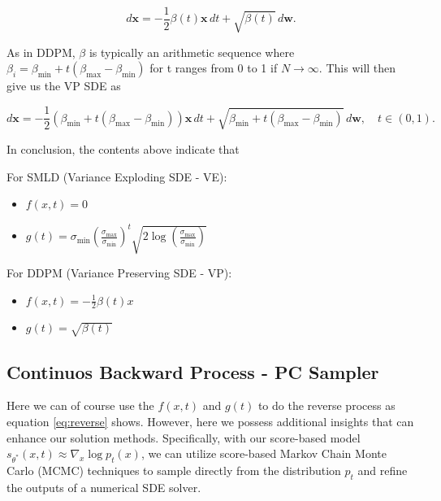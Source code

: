 \begin{equation}
d \mathbf{x} = -\frac{1}{2} \beta(t) \mathbf{x} \, dt + \sqrt{\beta(t)} \, d\mathbf{w}.\label{eq:vp-sde}
\end{equation}

\noindent
As in DDPM, $\beta$ is typically an arithmetic sequence where $\beta_i = \beta_{\min} + t (\beta_{\max} - \beta_{\min}) $ for t ranges from 0 to 1 if \( N \to \infty \). This will then give us the VP SDE as

\begin{equation}
    d \mathbf{x} = -\frac{1}{2} \left( \beta_{\min} + t (\beta_{\max} - \beta_{\min} )\right) \mathbf{x} \, dt + \sqrt{\beta_{\min} + t (\beta_{\max} - \beta_{\min})} \, d\mathbf{w}, \quad t \in (0, 1).
\end{equation}

\noindent
In conclusion, the contents above indicate that 

\noindent
For SMLD (Variance Exploding SDE - VE):
\begin{itemize}
    \item \( f(x, t) = 0 \)
    \item \( g(t) = \sigma_{\min} \left( \frac{\sigma_{\max}}{\sigma_{\min}} \right)^t \sqrt{2 \log \left( \frac{\sigma_{\max}}{\sigma_{\min}} \right)} \)
\end{itemize}

\vspace{1em}

\noindent
For DDPM (Variance Preserving SDE - VP):
\begin{itemize}
    \item \( f(x, t) = -\frac{1}{2} \beta(t) x \)
    \item \( g(t) = \sqrt{\beta(t)} \)
\end{itemize}

\subsection{Continuos Backward Process - PC Sampler}

Here we can of course use the $f(x,t)$ and $g(t)$ to do the reverse process as equation \eqref{eq:reverse} shows. However, here we possess additional insights that can enhance our solution methods. Specifically, with our score-based model 
$s_{\theta^*}(x, t) \approx \nabla_x \log p_t(x)
$, we can utilize score-based Markov Chain Monte Carlo (MCMC) techniques to sample directly from the distribution $p_t$ and refine the outputs of a numerical SDE solver.

